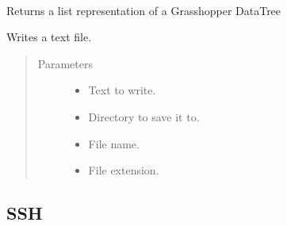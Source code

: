 \documentclass[letterpaper,10pt,english]{sphinxmanual}
\begin{document}

\begin{fulllineitems}
\label{\detokenize{lib:livestock.lib.misc.tree_to_list}}~
\begin{DUlineblock}{0em}
\item[] Returns a list representation of a Grasshopper DataTree
\item[] 
\end{DUlineblock}

\end{fulllineitems}


\begin{fulllineitems}
\label{\detokenize{lib:livestock.lib.misc.write_file}}
Writes a text file.
\begin{quote}\begin{description}
\item[{Parameters}] \leavevmode\begin{itemize}
\item {} 
 \textendash{} Text to write.

\item {} 
 \textendash{} Directory to save it to.

\item {} 
 \textendash{} File name.

\item {} 
 \textendash{} File extension.

\end{itemize}

\end{description}\end{quote}

\end{fulllineitems}



\subsection{SSH}
\label{\detokenize{lib:module-livestock.lib.ssh}}\label{\detokenize{lib:ssh}}
\end{document}
